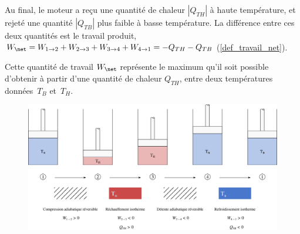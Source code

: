 		Au final, le moteur a reçu une quantité de chaleur $|Q_{TH}|$ à haute température, et rejeté une quantité $|Q_{TB}|$ plus faible à basse température. La différence entre ces deux quantités est le travail produit, $W_\net = W_{1 \to 2} + W_{2 \to 3} + W_{3 \to 4} + W_{4 \to 1} = - Q_{TH} - Q_{TB}$ (\ref{def_travail_net}).
		
		Cette quantité de travail $W_\net$ représente le maximum qu’il soit possible d’obtenir à partir d’une quantité de chaleur $Q_{TH}$, entre deux températures données~$T_B$ et~$T_H$.

		\begin{landscape}

		\begin{figure}
			\begin{center}
				\includegraphics[width=\linewidth]{images/moteur_carnot_sf.png}
			\end{center}
			\label{fig_carnot_quatre_etapes}
		\end{figure}


\end{landscape}
